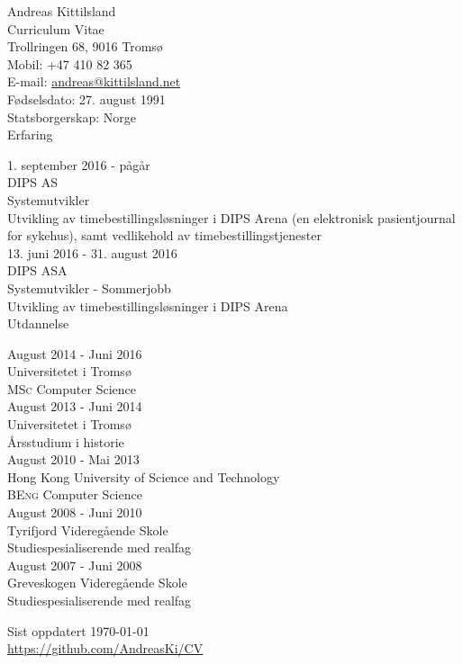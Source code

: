 \documentclass[norsk, 10pt, a4paper]{article}
\newcommand{\interval}[2]{\small{#1 - #2}}
\newcommand{\institution}[1]{\normalsize{#1}}
\newcommand{\position}[1]{\large{#1}}
\newcommand{\sect}[1]{\Large{#1}}
\newcommand{\course}[2]{\position{\textsc{#1} #2}}
\newcommand{\desc}[1]{\normalsize{#1}}
\begin{document}
{\LARGE Andreas Kittilsland}\\
{\large Curriculum Vitae}\\[10pt]
Trollringen 68, 9016 Tromsø\\
Mobil: +47 410 82 365\\
E-mail: \href{mailto:andreas@kittilsland.net}{andreas@kittilsland.net}\\
Fødselsdato: 27. august 1991\\
Statsborgerskap: Norge\\

\sect{Erfaring}

\interval{1. september 2016}{pågår}\\
\institution{DIPS AS}\\
\position{Systemutvikler}\\
\desc{Utvikling av timebestillingsløsninger i DIPS Arena (en elektronisk pasientjournal for sykehus), samt vedlikehold av timebestillingstjenester}\\

\interval{13. juni 2016}{31. august 2016}\\
\institution{DIPS ASA}\\
\position{Systemutvikler - Sommerjobb}\\
\desc{Utvikling av timebestillingsløsninger i DIPS Arena}\\

\sect{Utdannelse}

\interval{August 2014}{Juni 2016}\\
\institution{Universitetet i Tromsø}\\
\course{MSc}{Computer Science}\\

\interval{August 2013}{Juni 2014}\\
\institution{Universitetet i Tromsø}\\
\course{}{Årsstudium i historie}\\

\interval{August 2010}{Mai 2013}\\
\institution{Hong Kong University of Science and Technology}\\
\course{BEng}{Computer Science}\\

\interval{August 2008}{Juni 2010}\\
\institution{Tyrifjord Videregående Skole}\\
\course{}{Studiespesialiserende med realfag}\\

\interval{August 2007}{Juni 2008}\\
\institution{Greveskogen Videregående Skole}\\
\course{}{Studiespesialiserende med realfag}\\

\vfill{}

\begin{center}
{
  \scriptsize Sist oppdatert \today\\
  \href{https://github.com/AndreasKi/CV}{https://github.com/AndreasKi/CV}
}
\end{center}
\end{document}
